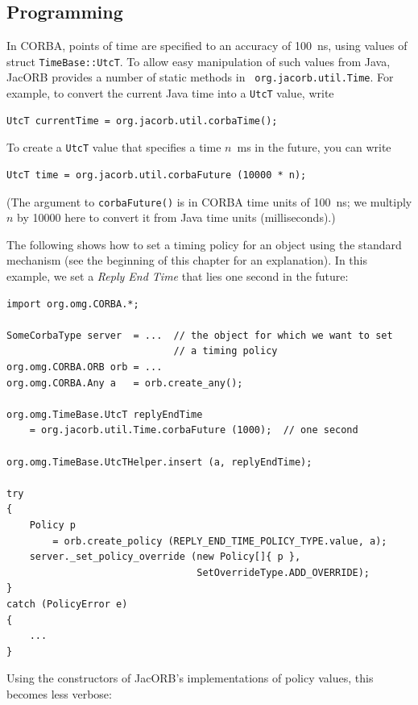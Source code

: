 \subsection*{Programming}

In CORBA, points of time are specified to an accuracy of 100~ns, using
values of struct {\tt TimeBase::UtcT}.  To allow easy manipulation of such
values from Java, JacORB provides a number of static methods in {\tt
org.jacorb.util.Time}.  For example, to convert the current Java time
into a {\tt UtcT} value, write

\begin{verbatim}
UtcT currentTime = org.jacorb.util.corbaTime();
\end{verbatim}

To create a {\tt UtcT} value that specifies a time $n$~ms in the
future, you can write

\begin{verbatim}
UtcT time = org.jacorb.util.corbaFuture (10000 * n);
\end{verbatim}

(The argument to {\tt corbaFuture()} is in CORBA time units of
100~ns; we multiply $n$ by 10000 here to convert it from Java time
units (milliseconds).)

The following shows how to set a timing policy for an object using the
standard mechanism (see the beginning of this chapter for an
explanation).  In this example, we set a \emph{Reply End Time} that
lies one second in the future:

\clearpage{}

\begin{verbatim}
import org.omg.CORBA.*;

SomeCorbaType server  = ...  // the object for which we want to set
                             // a timing policy
org.omg.CORBA.ORB orb = ...
org.omg.CORBA.Any a   = orb.create_any();

org.omg.TimeBase.UtcT replyEndTime
    = org.jacorb.util.Time.corbaFuture (1000);  // one second

org.omg.TimeBase.UtcTHelper.insert (a, replyEndTime);

try
{
    Policy p
        = orb.create_policy (REPLY_END_TIME_POLICY_TYPE.value, a);
    server._set_policy_override (new Policy[]{ p },
                                 SetOverrideType.ADD_OVERRIDE);
}
catch (PolicyError e)
{
    ...
}
\end{verbatim}

Using the constructors of JacORB's implementations of policy values,
this becomes less verbose:

